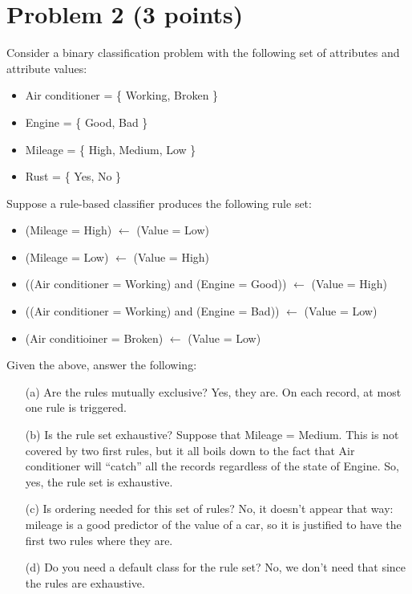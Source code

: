 \documentclass[10pt]{article}
\begin{document}
\section*{Problem 2 (3 points)}
Consider a binary classification problem with the following set of attributes and attribute values:
\begin{itemize}
  \item Air conditioner = \{ Working, Broken \}
  \item Engine = \{ Good, Bad \}
  \item Mileage = \{ High, Medium, Low \}
  \item Rust = \{ Yes, No \}
\end{itemize}
Suppose a rule-based classifier produces the following rule set:
\begin{itemize}
  \item (Mileage = High) $\leftarrow$ (Value = Low)
  \item (Mileage = Low) $\leftarrow$ (Value = High)
  \item ((Air conditioner = Working) and (Engine = Good)) $\leftarrow$ (Value = High)
  \item ((Air conditioner = Working) and (Engine = Bad)) $\leftarrow$ (Value = Low)
  \item (Air conditioiner = Broken) $\leftarrow$ (Value = Low)
\end{itemize}
Given the above, answer the following:
\begin{enumerate}
  \item[(a)] Are the rules mutually exclusive?
  \color{black} Yes, they are. On each record, at most one rule is triggered.
  
  \color{blue}
  \item[(b)] Is the rule set exhaustive? 
  \color{black} Suppose that Mileage = Medium. This is not covered by two first rules, but it all boils down to the fact that Air conditioner will ``catch'' all the records regardless of the state of Engine. So, yes, the rule set is exhaustive.

  \color{blue}
  \item[(c)] Is ordering needed for this set of rules?
  \color{black} No, it doesn't appear that way: mileage is a good predictor of the value of a car, so it is justified to have the first two rules where they are.
  
  \color{blue}
  \item[(d)] Do you need a default class for the rule set?
  \color{black}
  No, we don't need that since the rules are exhaustive.
\end{enumerate}
\end{document}
